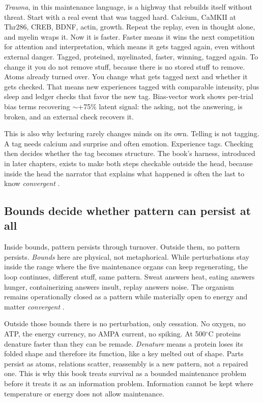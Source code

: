 \textit{Trauma}, in this maintenance language, is a highway that rebuilds itself without threat. Start with a real event that was tagged hard. Calcium, CaMKII at Thr286, CREB, BDNF, actin, growth. Repeat the replay, even in thought alone, and myelin wraps it. Now it is faster. Faster means it wins the next competition for attention and interpretation, which means it gets tagged again, even without external danger. Tagged, proteined, myelinated, faster, winning, tagged again. To change it you do not remove stuff, because there is no stored stuff to remove. Atoms already turned over. You change what gets tagged next and whether it gets checked. That means new experiences tagged with comparable intensity, plus sleep and ledger checks that favor the new tag. Bias-vector work \citep{macar2026} shows per-trial bias terms recovering $\sim$+75\% latent signal: the asking, not the answering, is broken, and an external check recovers it.

This is also why lecturing rarely changes minds on its own. Telling is not tagging. A tag needs calcium and surprise and often emotion. Experience tags. Checking then decides whether the tag becomes structure. The book's harness, introduced in later chapters, exists to make both steps checkable outside the head, because inside the head the narrator that explains what happened is often the last to know \textit{convergent} \citep{baars1988}.

\subsection*{Bounds decide whether pattern can persist at all}

Inside bounds, pattern persists through turnover. Outside them, no pattern persists. \textit{Bounds} here are physical, not metaphorical. While perturbations stay inside the range where the five maintenance organs can keep regenerating, the loop continues, different stuff, same pattern. Sweat answers heat, eating answers hunger, containerizing answers insult, replay answers noise. The organism remains operationally closed as a pattern while materially open to energy and matter \textit{convergent} \citep{maturana1980}.

Outside those bounds there is no perturbation, only cessation. No oxygen, no ATP, the energy currency, no AMPA current, no spiking. At 500$^\circ$C proteins denature faster than they can be remade. \textit{Denature} means a protein loses its folded shape and therefore its function, like a key melted out of shape. Parts persist as atoms, relations scatter, reassembly is a new pattern, not a repaired one. This is why this book treats survival as a bounded maintenance problem before it treats it as an information problem. Information cannot be kept where temperature or energy does not allow maintenance.

